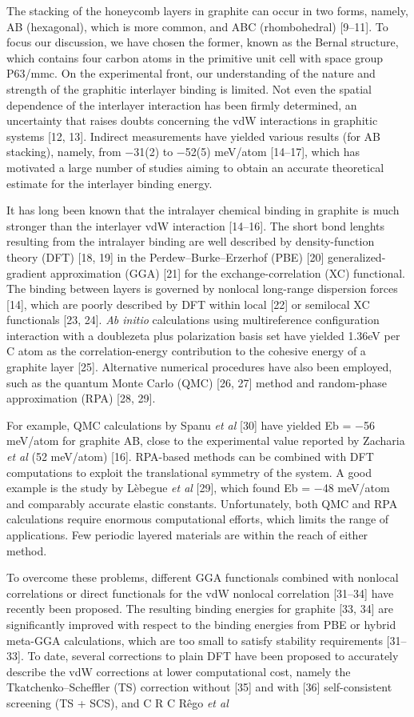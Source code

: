 \documentclass{article}
\begin{document}
The stacking of the honeycomb layers in graphite can occur in two forms, namely, AB (hexagonal), which is more common, and ABC (rhombohedral) [9–11]. To focus our discussion, we have chosen the former, known as the Bernal structure, which contains four carbon atoms in the primitive unit cell with space group P63/mmc. On the experimental front, our understanding of the nature and strength of the graphitic interlayer binding is limited. Not even the spatial dependence of the interlayer interaction has been firmly determined, an uncertainty that raises doubts concerning the vdW interactions in graphitic systems [12, 13]. Indirect measurements have yielded various results (for AB stacking), namely, from −31(2) to −52(5) meV/atom [14–17], which has motivated a large number of studies aiming to obtain an accurate theoretical estimate for the interlayer binding energy.

It has long been known that the intralayer chemical binding in graphite is much stronger than the interlayer vdW interaction [14–16]. The short bond lenghts resulting from the intralayer binding are well described by density-function theory (DFT) [18, 19] in the Perdew–Burke–Erzerhof (PBE) [20] generalized-gradient approximation (GGA) [21] for the exchange-correlation (XC) functional. The binding between layers is governed by nonlocal long-range dispersion forces [14], which are poorly described by DFT within local [22] or semilocal XC functionals [23, 24]. \textit{Ab initio} calculations using multireference configuration interaction with a doublezeta plus polarization basis set have yielded 1.36eV per C atom as the correlation-energy contribution to the cohesive energy of a graphite layer [25]. Alternative numerical procedures have also been employed, such as the quantum Monte Carlo (QMC) [26, 27] method and random-phase approximation (RPA) [28, 29].

For example, QMC calculations by Spanu \textit{et al} [30] have yielded Eb = −56 meV/atom for graphite AB, close to the experimental value reported by Zacharia \textit{et al} (52 meV/atom) [16]. RPA-based methods can be combined with DFT computations to exploit the translational symmetry of the system. A good example is the study by Lèbegue \textit{et al} [29], which found Eb = −48 meV/atom and comparably accurate elastic constants. Unfortunately, both QMC and RPA calculations require enormous computational efforts, which limits the range of applications. Few periodic layered materials are within the reach of either method.

To overcome these problems, different GGA functionals combined with nonlocal correlations or direct functionals for the vdW nonlocal correlation [31–34] have recently been proposed. The resulting binding energies for graphite [33, 34] are significantly improved with respect to the binding energies from PBE or hybrid meta-GGA calculations, which are too small to satisfy stability requirements [31–33]. To date, several corrections to plain DFT have been proposed to accurately describe the vdW corrections at lower computational cost, namely the Tkatchenko–Scheffler (TS) correction without [35] and with [36] self-consistent screening (TS + SCS), and C R C Rêgo \textit{et al}
\end{document}
